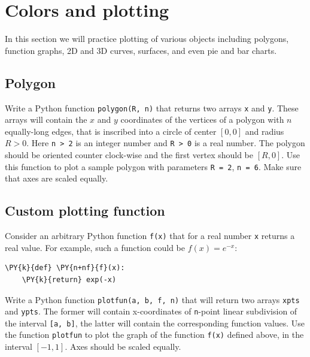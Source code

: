 \section{Colors and plotting}

In this section we will practice plotting of various objects including polygons, 
function graphs, 2D and 3D curves, surfaces, and even pie and bar charts. 


\subsection{Polygon}

Write a Python function {\tt polygon(R, n)} that returns two arrays {\tt x} and {\tt y}.
These arrays will contain the $x$ and $y$ coordinates of the vertices of a polygon 
with $n$ equally-long edges, that is inscribed into a circle of 
center $[0, 0]$ and radius $R > 0$. Here {\tt n > 2} is an integer number 
and {\tt R > 0} is a real number. The polygon should be oriented counter clock-wise
and the first vertex should be $[R, 0]$.
Use this function to plot a sample
polygon with parameters {\tt R = 2}, {\tt n = 6}. Make sure that axes are scaled equally.


\subsection{Custom plotting function}

Consider an arbitrary Python function {\tt f(x)} that for a real number 
{\tt x} returns a real value. For example, such a function could be 
$f(x) = e^{-x}$:

\begin{Verbatim}[commandchars=\\\{\}]
\PY{k}{def} \PY{n+nf}{f}(x):
    \PY{k}{return} exp(-x)
\end{Verbatim}
Write a Python function {\tt plotfun(a, b, f, n)} that will return two
arrays {\tt xpts} and {\tt ypts}. The former will contain x-coordinates of 
{\tt n}-point linear subdivision of the interval {\tt [a, b]}, the latter will
contain the corresponding function values. Use the function {\tt plotfun} to
plot the graph of the function {\tt f(x)} defined above, in the interval $[-1, 1]$.
Axes should be scaled equally.

